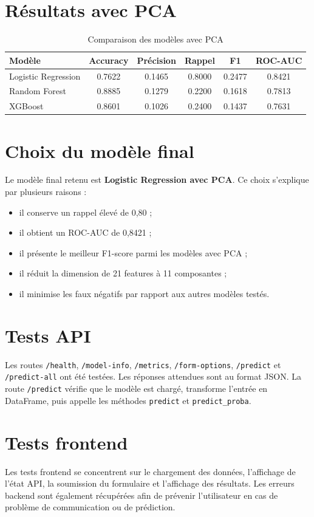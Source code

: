 \documentclass[12pt,a4paper]{report}
\begin{document}
\section{Résultats avec PCA}
\begin{table}[H]
\centering
\caption{Comparaison des modèles avec PCA}
\begin{tabular}{lccccc}
\toprule
\textbf{Modèle} & \textbf{Accuracy} & \textbf{Précision} & \textbf{Rappel} & \textbf{F1} & \textbf{ROC-AUC}\\
\midrule
Logistic Regression & 0.7622 & 0.1465 & 0.8000 & 0.2477 & 0.8421\\
Random Forest & 0.8885 & 0.1279 & 0.2200 & 0.1618 & 0.7813\\
XGBoost & 0.8601 & 0.1026 & 0.2400 & 0.1437 & 0.7631\\
\bottomrule
\end{tabular}
\end{table}

\section{Choix du modèle final}
Le modèle final retenu est \textbf{Logistic Regression avec PCA}. Ce choix s'explique par plusieurs raisons :
\begin{itemize}[label=--]
  \item il conserve un rappel élevé de 0,80 ;
  \item il obtient un ROC-AUC de 0,8421 ;
  \item il présente le meilleur F1-score parmi les modèles avec PCA ;
  \item il réduit la dimension de 21 features à 11 composantes ;
  \item il minimise les faux négatifs par rapport aux autres modèles testés.
\end{itemize}

\section{Tests API}
Les routes \texttt{/health}, \texttt{/model-info}, \texttt{/metrics}, \texttt{/form-options}, \texttt{/predict} et \texttt{/predict-all} ont été testées. Les réponses attendues sont au format JSON. La route \texttt{/predict} vérifie que le modèle est chargé, transforme l'entrée en DataFrame, puis appelle les méthodes \texttt{predict} et \texttt{predict\_proba}.

\section{Tests frontend}
Les tests frontend se concentrent sur le chargement des données, l'affichage de l'état API, la soumission du formulaire et l'affichage des résultats. Les erreurs backend sont également récupérées afin de prévenir l'utilisateur en cas de problème de communication ou de prédiction.
\end{document}
